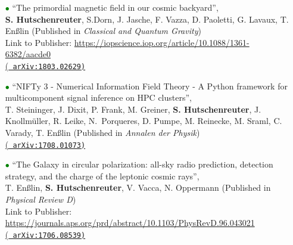\documentclass[11pt,a4paper,sans, table, dvipsnames]{moderncv}        %
\begin{document}
\begin{itemize}
\vspace{6pt}

\item[\textcolor{Green}{$\bullet$}]{``The primordial magnetic field in our cosmic backyard'', \\
\textbf{S. Hutschenreuter}, S.Dorn, J. Jasche, F. Vazza, D. Paoletti, G. Lavaux, T. En{\ss}lin ({\color{blue}Published in \textit{Classical and Quantum Gravity}})\\ Link to Publisher: \url{https://iopscience.iop.org/article/10.1088/1361-6382/aacde0} \\ \href{https://arxiv.org/abs/1803.02629}{(\texttt{{\color{blue} arXiv:1803.02629})}}}

\vspace{6pt}

\item[\textcolor{Green}{$\bullet$}]{``NIFTy 3 - Numerical Information Field Theory - A Python framework for multicomponent signal inference on HPC clusters'', \\
T. Steininger, J. Dixit, P. Frank, M. Greiner, \textbf{S. Hutschenreuter}, J. Knollm{\"u}ller, R. Leike, N.~Porqueres, D. Pumpe, M. Reinecke, M. Sraml, C. Varady, T. En{\ss}lin ({\color{blue}Published in \textit{Annalen der Physik}})\\ \href{https://arxiv.org/abs/1708.01073}{(\texttt{{\color{blue} arXiv:1708.01073})}}}

\vspace{6pt}

\item[\textcolor{Green}{$\bullet$}]{``The Galaxy in circular polarization: all-sky radio prediction, detection strategy, and the charge of the leptonic cosmic rays'', \\ T. En{\ss}lin,  \textbf{S. Hutschenreuter}, V. Vacca, N. Oppermann   ({\color{blue}Published in \textit{Physical Review D}})\\ Link to Publisher: \url{https://journals.aps.org/prd/abstract/10.1103/PhysRevD.96.043021} \\ \href{https://arxiv.org/abs/1706.08539}{(\texttt{{\color{blue} arXiv:1706.08539})}}}

\end{itemize}
\end{document}
